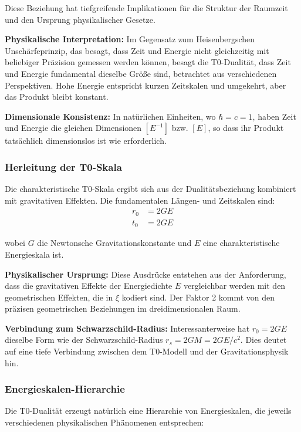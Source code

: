 \documentclass[12pt,a4paper]{article}
\newcommand{\xipar}{\xi}
\begin{document}
	Diese Beziehung hat tiefgreifende Implikationen für die Struktur der Raumzeit und den Ursprung physikalischer Gesetze.
	
	\textbf{Physikalische Interpretation:} Im Gegensatz zum Heisenbergschen Unschärfeprinzip, das besagt, dass Zeit und Energie nicht gleichzeitig mit beliebiger Präzision gemessen werden können, besagt die T0-Dualität, dass Zeit und Energie fundamental dieselbe Größe sind, betrachtet aus verschiedenen Perspektiven. Hohe Energie entspricht kurzen Zeitskalen und umgekehrt, aber das Produkt bleibt konstant.
	
	\textbf{Dimensionale Konsistenz:} In natürlichen Einheiten, wo $\hbar = c = 1$, haben Zeit und Energie die gleichen Dimensionen $[E^{-1}]$ bzw. $[E]$, so dass ihr Produkt tatsächlich dimensionslos ist wie erforderlich.
	
	\subsubsection{Herleitung der T0-Skala}
	
	Die charakteristische T0-Skala ergibt sich aus der Dualitätsbeziehung kombiniert mit gravitativen Effekten. Die fundamentalen Längen- und Zeitskalen sind:
	\begin{align}
		r_0 &= 2GE \\
		t_0 &= 2GE
	\end{align}
	
	wobei $G$ die Newtonsche Gravitationskonstante und $E$ eine charakteristische Energieskala ist.
	
	\textbf{Physikalischer Ursprung:} Diese Ausdrücke entstehen aus der Anforderung, dass die gravitativen Effekte der Energiedichte $E$ vergleichbar werden mit den geometrischen Effekten, die in $\xipar$ kodiert sind. Der Faktor 2 kommt von den präzisen geometrischen Beziehungen im dreidimensionalen Raum.
	
	\textbf{Verbindung zum Schwarzschild-Radius:} Interessanterweise hat $r_0 = 2GE$ dieselbe Form wie der Schwarzschild-Radius $r_s = 2GM = 2GE/c^2$. Dies deutet auf eine tiefe Verbindung zwischen dem T0-Modell und der Gravitationsphysik hin.
	
	\subsubsection{Energieskalen-Hierarchie}
	
	Die T0-Dualität erzeugt natürlich eine Hierarchie von Energieskalen, die jeweils verschiedenen physikalischen Phänomenen entsprechen:
	
\end{document}
